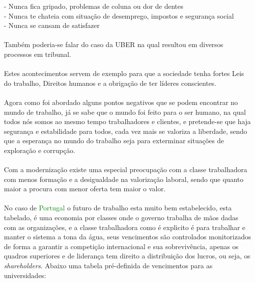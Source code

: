 \hspace*{.5cm} - Nunca fica gripado, problemas de coluna ou dor de dentes\\
\hspace*{.5cm} - Nunca te chateia com situação de desemprego, impostos e segurança social\\
\hspace*{.5cm} - Nunca se cansam de satisfazer\\
\\
Também poderia-se falar do caso da UBER na qual resultou em diversos processos em tribunal.\\
\\ 
Estes acontecimentos servem de exemplo para que a sociedade tenha fortes Leis do trabalho, Direitos humanos e a obrigação de ter líderes conscientes.\\
\\
Agora como foi abordado alguns pontos negativos que se podem encontrar no mundo de trabalho, já se sabe que o mundo foi feito para o ser humano, na qual todos nós somos ao mesmo tempo trabalhadores e clientes, e pretende-se que haja segurança e estabilidade para todos, cada vez mais se valoriza a liberdade, sendo que a esperança no mundo do trabalho seja para exterminar situações de exploração e corrupção.\\
\\
Com a modernização existe uma especial preocupação com a classe trabalhadora com menos formação e a desigualdade na valorização laboral, sendo que quanto maior a procura com menor oferta tem maior o valor.\\
\\
No caso de \textcolor{green}{Portugal} o futuro de trabalho esta muito bem estabelecido, esta tabelado, é uma economia por classes onde o governo trabalha de mãos dadas com as organizações, e a classe trabalhadora como é explicito é para trabalhar e manter o sistema a tona da água, seus vencimentos são controlados monitorizados de forma a garantir a competição internacional e sua sobrevivência, apenas os quadros superiores e de liderança tem direito a distribuição dos lucros, ou seja, os \textit{shareholders}.
\newpage
Abaixo uma tabela pré-definida de vencimentos para as universidades:\\
